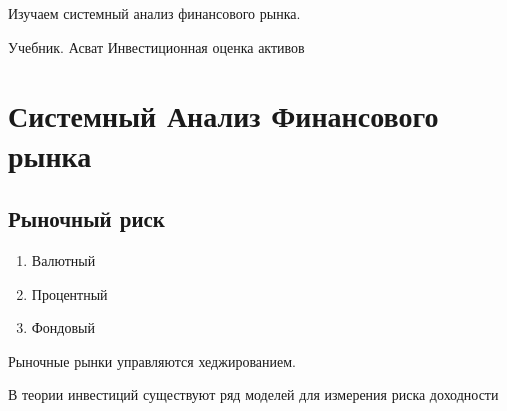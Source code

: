 \documentclass[14pt]{extarticle}
\title{}
\author{}
\date{}
\begin{document}
	\maketitle
	Изучаем системный анализ финансового рынка.

	Учебник. Асват Инвестиционная оценка активов
	\section{Системный Анализ Финансового рынка}
	\subsection{Рыночный риск}
	\begin{enumerate}
		\item Валютный
		\item Процентный
		\item Фондовый 
	\end{enumerate}
	Рыночные рынки управляются хеджированием.

	В теории инвестиций
	существуют ряд 
	моделей для измерения
	риска доходности
\end{document}
